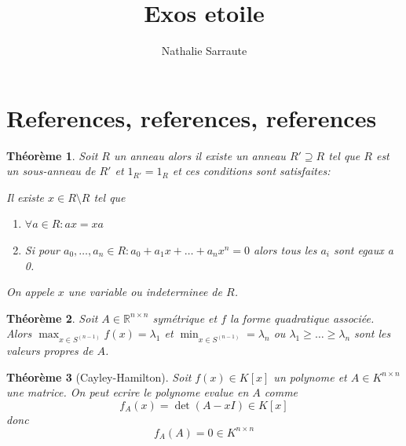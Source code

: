 \documentclass[a4paper,12pt,french]{report}
\title{Exos etoile}
\author{Nathalie Sarraute}
\theoremstyle{plain}
\newtheorem{theorem}{Théorème}[chapter]
\theoremstyle{definition}
\begin{document}
\maketitle
\tableofcontents
\chapter*{References, references, references}
\begin{theorem}\label{thm22}
Soit $R$ un anneau alors il existe un anneau $R'\supseteq R$ tel que $R$ est un sous-anneau de $R'$ et $1_{R'}=1_{R}$ et ces conditions sont satisfaites:

Il existe $x \in R\setminus R$ tel que
\begin{enumerate} 
\item  $\forall a\in R:ax=xa$
\item Si pour $a_{0},\dots,a_{n}\in R:a_{0}+a_{1}x+\dots+a_{n}x^{n}=0$ alors tous les $a_{i}$ sont egaux a 0.
\end{enumerate}
On appele $x$ une variable ou indeterminee de $R$. 
\end{theorem}
\begin{theorem}\label{thm69}
Soit $A\in \mathbb{R}^{n\times n}$ symétrique et $f$ la forme quadratique associée. Alors $\max_{x \in S^{(n-1)}}f(x)=\lambda_{1}$ et $\min_{x \in S^{(n-1)}}=\lambda _{n}$ ou $\lambda_{1}\ge \dots \ge\lambda _{n}$ sont les valeurs propres de $A$.
\end{theorem}
\begin{theorem}[Cayley-Hamilton]\label{cayley}
Soit $f(x)\in K[x]$ un polynome et $A\in K^{n\times n}$ une matrice. On peut ecrire le polynome evalue en $A$ comme 
$$
f_{A}(x)=\det(A-xI)\in K[x]
$$
donc 
$$
f_{A}(A)=0\in K^{n\times n}
$$
\end{theorem}
\end{document}
